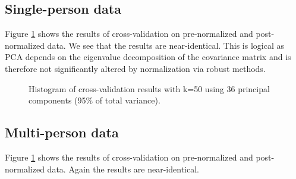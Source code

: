 \documentclass[paper=a4, fontsize=11pt]{scrartcl} %
\begin{document}
\subsection{Single-person data}
Figure \ref{fig:hist} shows the results of cross-validation on pre-normalized and post-normalized data. We see that the results are near-identical. This is logical as PCA depends on the eigenvalue decomposition of the covariance matrix and is therefore not significantly altered by normalization via robust methods.

\begin{figure}[h]
    \centering
    \caption{Histogram of cross-validation results with k=50 using 36 principal components (95\% of total variance).}
    \label{fig:hist}
\end{figure}

\clearpage
\subsection{Multi-person data}

Figure \ref{fig:hist} shows the results of cross-validation on pre-normalized and post-normalized data. Again the results are near-identical.%
\end{document}
